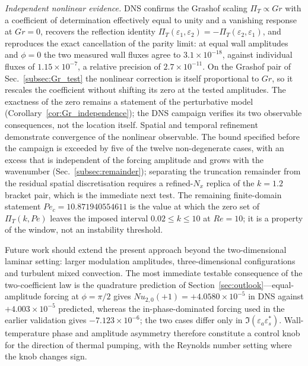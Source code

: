 \documentclass[12pt,a4paper]{article}
\newcommand{\Rey}{\mathit{Re}}
\newcommand{\Pe}{\mathit{Pe}}
\newcommand{\Grr}{\mathit{Gr}}
\newcommand{\Nu}{\mathit{Nu}}
\newcommand{\PiT}{\Pi_T}
\begin{document}
\emph{Independent nonlinear evidence.} DNS confirms the Grashof scaling
$\PiT\propto\Grr$ with a coefficient of determination effectively equal to unity
and a vanishing response at $\Grr=0$, recovers the reflection identity
$\PiT(\varepsilon_1,\varepsilon_2)=-\PiT(\varepsilon_2,\varepsilon_1)$, and
reproduces the exact cancellation of the parity limit: at equal wall amplitudes
and $\phi=0$ the two measured wall fluxes agree to $3.1\times10^{-18}$, against
individual fluxes of $1.15\times10^{-7}$, a relative precision of
$2.7\times10^{-11}$. On the Grashof pair of Sec.~\ref{subsec:Gr_test} the
nonlinear correction is itself proportional to $\Grr$, so it rescales the
coefficient without shifting its zero at the tested amplitudes. The exactness of
the zero remains a statement of the perturbative model
(Corollary~\ref{cor:Gr_independence}); the DNS campaign verifies its two observable
consequences, not the location itself.
Spatial and temporal refinement demonstrate convergence of the nonlinear
observable. The bound specified before the campaign is exceeded
by five of the twelve non-degenerate cases, with an excess that is independent
of the forcing amplitude and grows with the wavenumber (Sec.~\ref{subsec:remainder}); separating the truncation remainder
from the residual spatial discretisation requires a refined-$N_x$ replica of
the $k=1.2$ bracket pair, which is the immediate next test. The remaining
finite-domain statement
$\Pe_c=10.871940554611$ is the value at which the zero set of $\PiT(k,\Pe)$
leaves the imposed interval $0.02\le k\le10$ at $\Rey=10$; it is a property of
the window, not an instability threshold.

Future work should extend the present approach beyond the two-dimensional
laminar setting: larger modulation amplitudes, three-dimensional configurations
and turbulent mixed convection. The most immediate testable consequence of the
two-coefficient law is the quadrature prediction of
Section~\ref{sec:outlook}---equal-amplitude forcing at $\phi=\pi/2$ gives
$\Nu_{2,0}(+1)=+4.0580\times10^{-5}$ in DNS against $+4.003\times10^{-5}$
predicted, whereas the in-phase-dominated forcing used in the earlier validation
gives $-7.123\times10^{-6}$; the two cases differ only
in $\Im(\varepsilon_a\varepsilon_s^{*})$. Wall-temperature phase and amplitude
asymmetry therefore constitute a control knob for the direction of thermal
pumping, with the Reynolds number setting where the knob changes sign.
\end{document}
